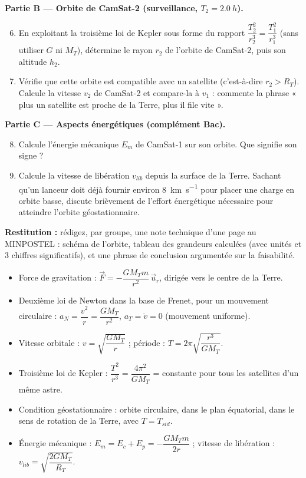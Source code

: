 \documentclass[11pt]{article}
\newcounter{popsec}
\newcounter{popsub}
\newcommand{\courssub}[1]{%
  \stepcounter{popsub}%
  \par\vspace{9pt}\noindent{\popxbold\fontsize{11.5}{13}\selectfont\color{popink}{\color{poporange}\thepopsec.\thepopsub}\hspace{6pt}#1}\par\nopagebreak\vspace{4pt}
}
\begin{document}
\textbf{Partie B — Orbite de CamSat-2 (surveillance, $T_2 = \SI{2,0}{h}$).}
\begin{enumerate}
\setcounter{enumi}{5}
\item En exploitant la troisième loi de Kepler sous forme du rapport $\dfrac{T_2^2}{r_2^3} = \dfrac{T_1^2}{r_1^3}$ (sans utiliser $G$ ni $M_T$), détermine le rayon $r_2$ de l'orbite de CamSat-2, puis son altitude $h_2$.
\item Vérifie que cette orbite est compatible avec un satellite (c'est-à-dire $r_2 > R_T$). Calcule la vitesse $v_2$ de CamSat-2 et compare-la à $v_1$ : commente la phrase « plus un satellite est proche de la Terre, plus il file vite ».
\end{enumerate}

\textbf{Partie C — Aspects énergétiques (complément Bac).}
\begin{enumerate}
\setcounter{enumi}{7}
\item Calcule l'énergie mécanique $E_m$ de CamSat-1 sur son orbite. Que signifie son signe ?
\item Calcule la vitesse de libération $v_{lib}$ depuis la surface de la Terre. Sachant qu'un lanceur doit déjà fournir environ \SI{8}{km.s^{-1}} pour placer une charge en orbite basse, discute brièvement de l'effort énergétique nécessaire pour atteindre l'orbite géostationnaire.
\end{enumerate}

\textbf{Restitution :} rédigez, par groupe, une note technique d'une page au MINPOSTEL : schéma de l'orbite, tableau des grandeurs calculées (avec unités et 3 chiffres significatifs), et une phrase de conclusion argumentée sur la faisabilité.

\courssub{Ressources à mobiliser}

\begin{aretenir}
\begin{itemize}
\item Force de gravitation : $\vec{F} = -\dfrac{G M_T m}{r^2}\,\vec{u}_r$, dirigée vers le centre de la Terre.
\item Deuxième loi de Newton dans la base de Frenet, pour un mouvement circulaire : $a_N = \dfrac{v^2}{r} = \dfrac{G M_T}{r^2}$, $a_T = \dot{v} = 0$ (mouvement uniforme).
\item Vitesse orbitale : $v = \sqrt{\dfrac{G M_T}{r}}$ ; période : $T = 2\pi\sqrt{\dfrac{r^3}{G M_T}}$.
\item Troisième loi de Kepler : $\dfrac{T^2}{r^3} = \dfrac{4\pi^2}{G M_T}$ = constante pour tous les satellites d'un même astre.
\item Condition géostationnaire : orbite circulaire, dans le plan équatorial, dans le sens de rotation de la Terre, avec $T = T_{sid}$.
\item Énergie mécanique : $E_m = E_c + E_p = -\dfrac{G M_T m}{2r}$ ; vitesse de libération : $v_{lib} = \sqrt{\dfrac{2 G M_T}{R_T}}$.
\end{itemize}
\end{aretenir}
\end{document}
